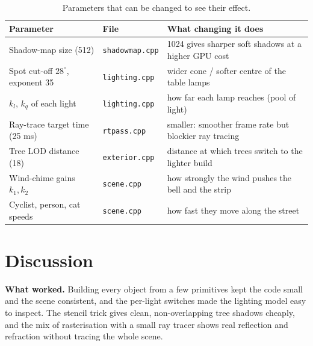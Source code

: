 \documentclass[10pt,a4paper]{article}
\newcommand{\code}[1]{\texttt{\small #1}}
\begin{document}
\begin{table}[htbp]
\centering\small
\begin{tabular}{@{}p{4.7cm}p{3.0cm}p{8.2cm}@{}}
\toprule
\textbf{Parameter} & \textbf{File} & \textbf{What changing it does}\\
\midrule
Shadow-map size (512) & \code{shadowmap.cpp} & 1024 gives sharper soft shadows at a higher GPU cost\\
Spot cut-off $28^\circ$, exponent 35 & \code{lighting.cpp} & wider cone / softer centre of the table lamps\\
$k_l$, $k_q$ of each light & \code{lighting.cpp} & how far each lamp reaches (pool of light)\\
Ray-trace target time (25 ms) & \code{rtpass.cpp} & smaller: smoother frame rate but blockier ray tracing\\
Tree LOD distance (18) & \code{exterior.cpp} & distance at which trees switch to the lighter build\\
Wind-chime gains $k_1,k_2$ & \code{scene.cpp} & how strongly the wind pushes the bell and the strip\\
Cyclist, person, cat speeds & \code{scene.cpp} & how fast they move along the street\\
\bottomrule
\end{tabular}
\caption{Parameters that can be changed to see their effect.}\label{tab:params}
\end{table}

\section{Discussion}
\textbf{What worked.} Building every object from a few primitives kept the code small and the scene consistent, and the per-light switches made the lighting model easy to inspect. The stencil trick gives clean, non-overlapping tree shadows cheaply, and the mix of rasterisation with a small ray tracer shows real reflection and refraction without tracing the whole scene.
\end{document}

